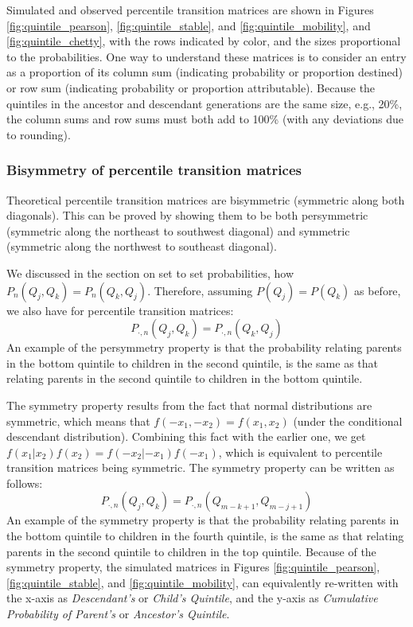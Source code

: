 \documentclass[a4paper,11pt]{article} %
\begin{document}
Simulated and observed percentile transition matrices are shown in Figures \ref{fig:quintile_pearson}, \ref{fig:quintile_stable}, and \ref{fig:quintile_mobility}, and \ref{fig:quintile_chetty}, with the rows indicated by color, and the sizes proportional to the probabilities. One way to understand these matrices is to consider an entry as a proportion of its column sum (indicating probability or proportion destined) or row sum (indicating probability or proportion attributable). Because the quintiles in the ancestor and descendant generations are the same size, e.g., 20\%, the column sums and row sums must both add to 100\% (with any deviations due to rounding). 

\subsubsection*{Bisymmetry of percentile transition matrices}

Theoretical percentile transition matrices are bisymmetric (symmetric along both diagonals). This can be proved by showing them to be both persymmetric (symmetric along the northeast to southwest diagonal) and symmetric (symmetric along the northwest to southeast diagonal). 

We discussed in the section on set to set probabilities, how $P_n(Q_j, Q_k) = P_n(Q_k, Q_j)$. Therefore, assuming  $P(Q_j) = P(Q_k)$ as before, we also have for percentile transition matrices: 
$$P_{ \cdot, n}(Q_j, Q_k) = P_{\cdot, n}(Q_k, Q_j)$$
An example of the persymmetry property is that the probability relating parents in the bottom quintile to children in the second quintile, is the same as that relating parents in the second quintile to children in the bottom quintile.

The symmetry property results from the fact that normal distributions are symmetric, which means that $f(-x_1,-x_2) = f(x_1,x_2)$ (under the conditional descendant distribution). Combining this fact with the earlier one, we get $f(x_1|x_2)f(x_2) = f(-x_2|-x_1)f(-x_1)$, which is equivalent to percentile transition matrices being symmetric. The symmetry property can be written as follows:
$$P_{ \cdot, n}(Q_j, Q_k) = P_{\cdot, n}(Q_{m-k+1}, Q_{m-j+1})$$
An example of the symmetry property is that the probability relating parents in the bottom quintile to children in the fourth quintile, is the same as that relating parents in the second quintile to children in the top quintile. Because of the symmetry property, the simulated matrices in Figures \ref{fig:quintile_pearson}, \ref{fig:quintile_stable}, and \ref{fig:quintile_mobility}, can equivalently re-written with the x-axis as \emph{Descendant's} or \emph{Child's Quintile}, and the y-axis as \emph{Cumulative Probability of Parent's} or \emph{Ancestor's Quintile}. 
\end{document}
